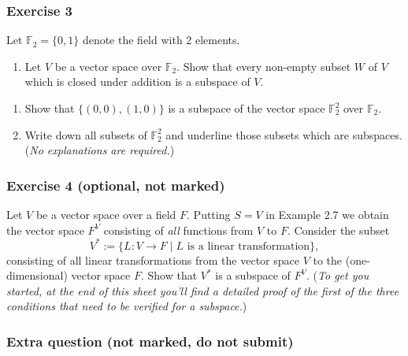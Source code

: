 \documentclass[
  12pt,
  a4paper,
  twoside]{article}
\providecommand{\tightlist}{%
  \setlength{\itemsep}{0pt}\setlength{\parskip}{0pt}}
\theoremstyle{plain}
\theoremstyle{definition}
\begin{document}
\hypertarget{exercise-3-4}{%
\subsubsection*{Exercise 3}\label{exercise-3-4}}

Let \(\mathbb{F}_2 = \{0, 1\}\) denote the field with 2 elements.

\begin{enumerate}
\def\labelenumi{(\alph{enumi})}
\tightlist
\item
  Let \(V\) be a vector space over \(\mathbb{F}_2\). Show that every
  non-empty subset \(W\) of \(V\) which is closed under addition is a
  subspace of \(V\).
\end{enumerate}

\begin{enumerate}
\def\labelenumi{(\alph{enumi})}
\setcounter{enumi}{1}
\item
  Show that \(\{(0,0), (1,0)\}\) is a subspace of the vector
  space \(\mathbb{F}_2^2\) over \(\mathbb{F}_2\).
\item
  Write down all subsets of \(\mathbb{F}_2^2\) and underline those
  subsets which are subspaces. (\emph{No explanations are
  required.})
\end{enumerate}

\hypertarget{exercise-4-optional-not-marked}{%
\subsubsection*{Exercise 4 (optional, not marked)}\label{exercise-4-optional-not-marked}}

Let \(V\) be a vector space over a field \(F\). Putting \(S=V\) in
Example 2.7 we obtain the vector space \(F^V\) consisting of
\emph{all} functions from \(V\) to \(F\). Consider the subset
\[V^*:=\{L:V \rightarrow F \;|\; L \textrm{ is a linear
transformation}\},\] consisting of all linear transformations
from the vector space \(V\) to the (one-dimensional) vector space
\(F\). Show that \(V^{*}\) is a subspace of \(F^{V}\).
(\emph{To get you started, at the end of this sheet you'll find a detailed
proof of the first of the three conditions that need to be verified for a
subspace.})

\hypertarget{extra-question-not-marked-do-not-submit}{%
\subsubsection*{Extra question (not marked, do not submit)}\label{extra-question-not-marked-do-not-submit}}
\end{document}
